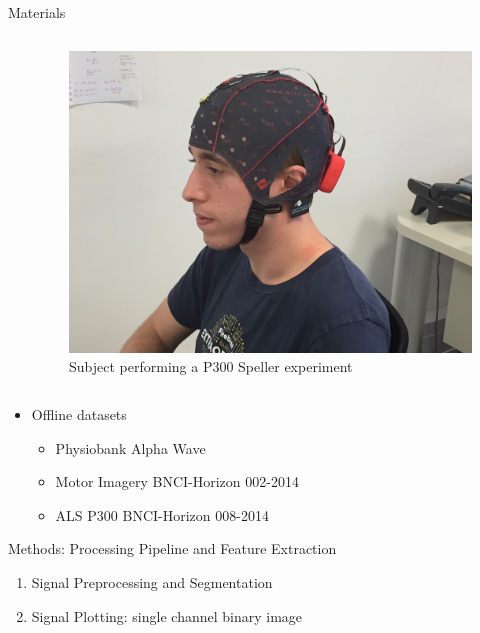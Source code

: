 \documentclass[final,hyperref={pdfpagelabels=false}]{beamer}
\begin{document}
\begin{frame}[t]
\begin{columns}[t]
\begin{column}{.465\textwidth}
\begin{block}{Materials}
\begin{columns}
\begin{column}{.54\textwidth}
\begin{itemize}
\end{itemize}
\end{column}

\begin{column}{.43\textwidth} %
\centering
\begin{figure}
\includegraphics[width=0.8\linewidth]{gTecSubject.jpg}
\caption{Subject performing a P300 Speller experiment}
\end{figure}
\end{column}
\end{columns} %

\begin{itemize}
\item Offline datasets
\begin{itemize}
\item Physiobank Alpha Wave
\item Motor Imagery BNCI-Horizon 002-2014
\item ALS P300 BNCI-Horizon 008-2014
\end{itemize}
\end{itemize}

\end{block}


\begin{block}{Methods: Processing Pipeline and Feature Extraction}
\begin{enumerate}
\item Signal Preprocessing and Segmentation
\item Signal Plotting: single channel binary image 


\end{enumerate}
\end{block}
\end{column}
\end{columns}
\end{frame}
\end{document}
